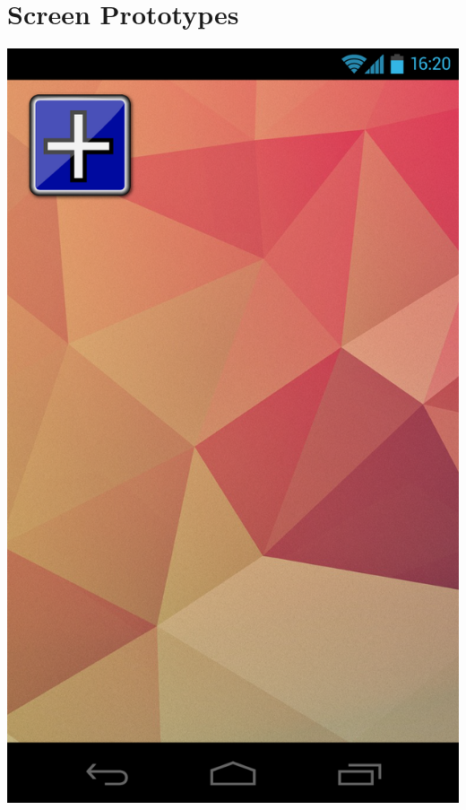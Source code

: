 \documentclass[pdftex,12pt,a4paper]{report}
\begin{document}
\section*{Screen Prototypes}
\begin{center}
	\includegraphics[scale=0.18]{Screens/00-Launch.png}

\end{center}
\end{document}
